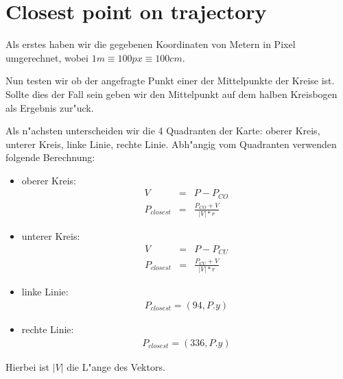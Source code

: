 \documentclass[10pt,oneside,a4paper]{article}
\begin{document}
  \section{Closest point on trajectory}
    Als erstes haben wir die gegebenen Koordinaten von Metern in Pixel umgerechnet, wobei \( 1m
    \equiv 100px \equiv 100cm \).

    Nun testen wir ob der angefragte Punkt einer der Mittelpunkte der Kreise ist. Sollte dies der
    Fall sein geben wir den Mittelpunkt auf dem halben Kreisbogen als Ergebnis zur"uck.

    Als n"achsten unterscheiden wir die 4 Quadranten der Karte: oberer Kreis, unterer Kreis, linke
    Linie, rechte Linie. Abh"angig vom Quadranten verwenden folgende Berechnung:
    \begin{itemize}
      \item{oberer Kreis:}
        \begin{eqnarray*}
          V & = & P - P_{CO} \\
          P_{closest} & = & \frac{P_{CO} + V}{|V| * r}
        \end{eqnarray*}
      \item{unterer Kreis:}
        \begin{eqnarray*}
          V & = & P - P_{CU} \\
          P_{closest} & = & \frac{P_{CU} + V}{|V| * r}
        \end{eqnarray*}
      \item{linke Linie:}
        \begin{eqnarray*}
          P_{closest} = (94, P.y)
        \end{eqnarray*}
      \item{rechte Linie:}
        \begin{eqnarray*}
          P_{closest} = (336, P.y)
        \end{eqnarray*}
    \end{itemize}
    Hierbei ist \( |V| \) die L"ange des Vektors.
\end{document}
